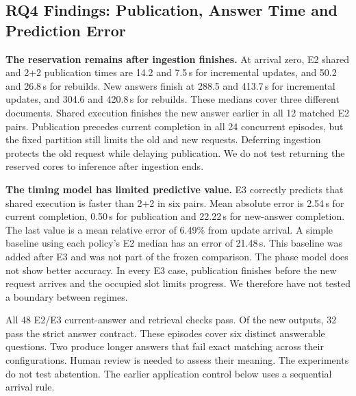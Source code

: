 \subsection{RQ4 Findings: Publication, Answer Time and Prediction Error}
\textbf{The reservation remains after ingestion finishes.} At arrival zero,
E2 shared and 2+2 publication times are 14.2 and 7.5\,s for incremental updates,
and 50.2 and 26.8\,s for rebuilds. New answers finish at 288.5 and 413.7\,s for
incremental updates, and 304.6 and 420.8\,s for rebuilds. These medians cover
three different documents. Shared execution finishes the new answer earlier
in all 12 matched E2 pairs. Publication precedes current completion in all 24
concurrent episodes, but the fixed partition still limits the old and new
requests. Deferring ingestion protects the old request while delaying publication.
We do not test returning the reserved cores to inference after ingestion ends.

\textbf{The timing model has limited predictive value.} E3 correctly predicts
that shared execution is faster than 2+2 in six pairs. Mean absolute error is
2.54\,s for current completion, 0.50\,s for publication and 22.22\,s for new-answer
completion. The last value is a mean relative error of 6.49\% from update
arrival. A simple baseline using each policy's E2 median has an error of
21.48\,s. This baseline was added after E3 and was not part of the frozen
comparison. The phase model does not show better accuracy. In every E3 case,
publication finishes before the new request arrives and the occupied slot
limits progress. We therefore have not tested a boundary between regimes.

All 48 E2/E3 current-answer and retrieval checks pass. Of the new outputs,
32 pass the strict answer contract. These episodes cover six distinct
answerable questions. Two produce longer answers that fail exact matching
across their configurations. Human review is needed to assess their meaning.
The experiments do not test abstention. The earlier application control below uses a sequential arrival rule.
